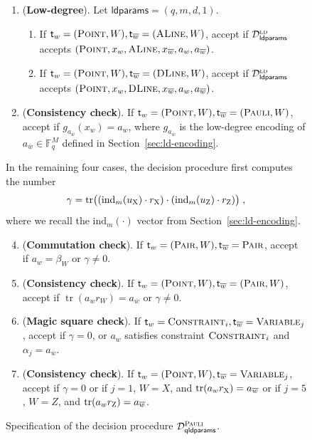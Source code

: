 \documentclass[11pt]{article}
\theoremstyle{definition}
\newcommand{\F}{\ensuremath{\mathbb{F}}}
\newcommand{\ld}{\textsc{ld}}
\newcommand{\ind}{\ensuremath{\mathrm{ind}}}
\DeclareMathOperator{\tr}{tr}
\newcommand{\decider}{\mathcal{D}}
\newcommand{\gamestyle}[1]{\ensuremath{\textsc{#1}}\xspace}
\newcommand{\pauli}{\gamestyle{Pauli}}
\newcommand{\labelstyle}[1]{\ensuremath{\textsc{#1}}\xspace}
\newcommand{\xpt}{\labelstyle{X}}
\newcommand{\zpt}{\labelstyle{Z}}
\newcommand{\tvarstyle}[1]{\mathsf{#1}}
\newcommand{\tvar}{\ensuremath{\tvarstyle{t}}}
\newcommand{\typestyle}[1]{\ensuremath{\textsc{#1}}\xspace}
\newcommand{\Point}{\typestyle{Point}}
\newcommand{\ALine}{\typestyle{ALine}}
\newcommand{\DLine}{\typestyle{DLine}}
\newcommand{\Pair}{\typestyle{Pair}}
\newcommand{\Constraint}{\typestyle{Constraint}}
\newcommand{\Variable}{\typestyle{Variable}}
\newcommand{\Pauli}{\typestyle{Pauli}}
\newcommand{\qldparams}{\mathsf{qldparams}}
\newcommand{\ldparams}{\mathsf{ldparams}}
\newenvironment{gamespec}{
  \begin{mdframed}[style=figstyle]}{
  \end{mdframed}}
\begin{document}
\begin{figure}[H]
\begin{gamespec}
\begin{enumerate}[itemsep=2pt,parsep=2pt]
    \item (\textbf{Low-degree}).
      \label{item:low-degree}
      Let $\ldparams = (q,m,d,1)$. 
      \begin{enumerate}
      	\item If $\tvar_w = (\Point, W), \tvar_{\overline{w}} = (\ALine, W)$, accept if
      $\decider^\ld_{\ldparams}$ accepts $(\Point, x_w, \ALine, x_{\overline{w}}, a_w,
      a_{\overline{w}})$.
      	\item If $\tvar_w = (\Point, W), \tvar_{\overline{w}} = (\DLine, W)$, accept if
      $\decider^\ld_{\ldparams}$ accepts $(\Point, x_w, \DLine, x_{\overline{w}}, a_w,
      a_{\overline{w}})$.
		\end{enumerate}
    \item (\textbf{Consistency check}).
      \label{item:low-degree-consistency}
      If $\tvar_w = (\Point, W), \tvar_{\overline{w}} = (\Pauli, W)$, accept if
      $g_{a_{\overline{w}}}(x_w) = a_w$, where $g_{a_{\overline{w}}}$ is
      the low-degree encoding of $a_{\overline{w}} \in \F_q^M$ defined in
      Section~\ref{sec:ld-encoding}.
    \end{enumerate}
    In the remaining four cases, the decision procedure first computes the
    number
    \begin{equation}
      \label{eq:gamma-value}
      \gamma = \tr \bigl( (\ind_{m}(u_\xpt) \cdot r_\xpt) \cdot
      (\ind_{m}(u_\zpt) \cdot r_\zpt) \bigr)\;,
    \end{equation}
    where we recall the $\ind_{m}(\cdot)$ vector from Section~\ref{sec:ld-encoding}.
    \begin{enumerate}[itemsep=2pt,parsep=2pt]
      \setcounter{enumi}{3}
    \item (\textbf{Commutation check}).
      \label{item:commutation} If $\tvar_w = (\Pair, W), \tvar_{\overline{w}} =
      \Pair$, accept if $a_w = \beta_W$ or $\gamma \neq 0$.
    \item (\textbf{Consistency check}).
      \label{item:commutation-consistency} If $\tvar_w = (\Point,W), \tvar_{\overline{w}} =
      (\Pair,W)$, accept if $\tr (a_w r_W) = a_{\overline{w}}$ or $\gamma \neq 0$.
      
    \item (\textbf{Magic square check}).
      \label{item:magic-square} If $\tvar_w = \Constraint_i,
      \tvar_{\overline{w}} = \Variable_j$, accept if $\gamma = 0$, or $a_w$
      satisfies constraint $\Constraint_i$ and $ \alpha_j = a_{\overline{w}}$.

    \item (\textbf{Consistency check}).
      \label{item:magic-square-consistency}
      If $\tvar_w = (\Point,W), \tvar_{\overline{w}} = \Variable_j$, accept if
      $\gamma = 0$ or if $j = 1$, $W = X$, and $\tr(a_w r_\xpt) =
      a_{\overline{w}}$ or if $j = 5$, $W = Z$, and $\tr(a_w r_\zpt) =
      a_{\overline{w}}$.
    \end{enumerate}
  \end{gamespec}
  \caption{Specification of the decision procedure $\decider^\pauli_\qldparams$.}
  \label{fig:decider_pauli}
\end{figure}
\end{document}
